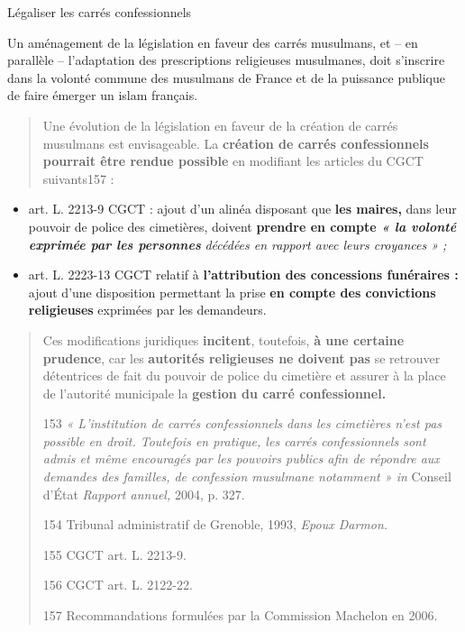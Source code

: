 Légaliser les carrés confessionnels

Un aménagement de la législation en faveur des carrés musulmans, et --
en parallèle -- l'adaptation des prescriptions religieuses musulmanes,
doit s'inscrire dans la volonté commune des musulmans de France et de la
puissance publique de faire émerger un islam français.

\begin{quote}
Une évolution de la législation en faveur de la création de carrés
musulmans est envisageable. La \textbf{création de carrés confessionnels
pourrait être rendue possible} en modifiant les articles du CGCT
suivants157 :
\end{quote}

\begin{itemize}
\item
  art. L. 2213-9 CGCT : ajout d'un alinéa disposant que \textbf{les
  maires,} dans leur pouvoir de police des cimetières, doivent
  \textbf{prendre en compte \emph{« la volonté exprimée par les
  personnes }}\emph{décédées en rapport avec leurs croyances » ;}
\item
  art. L. 2223-13 CGCT relatif à \textbf{l'attribution des concessions
  funéraires :} ajout d'une disposition permettant la prise \textbf{en
  compte des convictions religieuses} exprimées par les demandeurs.
\end{itemize}

\begin{quote}
Ces modifications juridiques \textbf{incitent}, toutefois, \textbf{à une
certaine prudence}, car les \textbf{autorités religieuses ne doivent
pas} se retrouver détentrices de fait du pouvoir de police du cimetière
et assurer à la place de l'autorité municipale la \textbf{gestion du
carré confessionnel.}

153 \emph{« L'institution de carrés confessionnels dans les cimetières
n'est pas possible en droit. Toutefois en pratique, les carrés
confessionnels sont admis et même encouragés par les pouvoirs publics
afin de répondre aux demandes des familles, de confession musulmane
notamment » in} Conseil d'État \emph{Rapport annuel,} 2004, p. 327.

154 Tribunal administratif de Grenoble, 1993, \emph{Epoux Darmon.}

155 CGCT art. L. 2213-9.

156 CGCT art. L. 2122-22.

157 Recommandations formulées par la Commission Machelon en 2006.


\end{quote}

